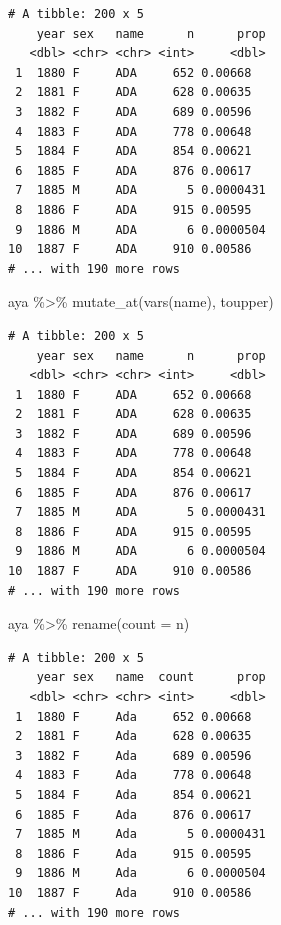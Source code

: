 \documentclass[
]{book}
\newenvironment{Shaded}{\begin{snugshade}}{\end{snugshade}}
\newcommand{\AttributeTok}[1]{\textcolor[rgb]{0.77,0.63,0.00}{#1}}
\newcommand{\FunctionTok}[1]{\textcolor[rgb]{0.00,0.00,0.00}{#1}}
\newcommand{\NormalTok}[1]{#1}
\newcommand{\SpecialCharTok}[1]{\textcolor[rgb]{0.00,0.00,0.00}{#1}}
\begin{document}
\begin{verbatim}
# A tibble: 200 x 5
    year sex   name      n      prop
   <dbl> <chr> <chr> <int>     <dbl>
 1  1880 F     ADA     652 0.00668  
 2  1881 F     ADA     628 0.00635  
 3  1882 F     ADA     689 0.00596  
 4  1883 F     ADA     778 0.00648  
 5  1884 F     ADA     854 0.00621  
 6  1885 F     ADA     876 0.00617  
 7  1885 M     ADA       5 0.0000431
 8  1886 F     ADA     915 0.00595  
 9  1886 M     ADA       6 0.0000504
10  1887 F     ADA     910 0.00586  
# ... with 190 more rows
\end{verbatim}

\begin{Shaded}
\begin{Highlighting}[]
\NormalTok{aya }\SpecialCharTok{\%\textgreater{}\%} \FunctionTok{mutate\_at}\NormalTok{(}\FunctionTok{vars}\NormalTok{(name), toupper)}
\end{Highlighting}
\end{Shaded}

\begin{verbatim}
# A tibble: 200 x 5
    year sex   name      n      prop
   <dbl> <chr> <chr> <int>     <dbl>
 1  1880 F     ADA     652 0.00668  
 2  1881 F     ADA     628 0.00635  
 3  1882 F     ADA     689 0.00596  
 4  1883 F     ADA     778 0.00648  
 5  1884 F     ADA     854 0.00621  
 6  1885 F     ADA     876 0.00617  
 7  1885 M     ADA       5 0.0000431
 8  1886 F     ADA     915 0.00595  
 9  1886 M     ADA       6 0.0000504
10  1887 F     ADA     910 0.00586  
# ... with 190 more rows
\end{verbatim}

\begin{Shaded}
\begin{Highlighting}[]
\NormalTok{aya }\SpecialCharTok{\%\textgreater{}\%} \FunctionTok{rename}\NormalTok{(}\AttributeTok{count =}\NormalTok{ n)}
\end{Highlighting}
\end{Shaded}

\begin{verbatim}
# A tibble: 200 x 5
    year sex   name  count      prop
   <dbl> <chr> <chr> <int>     <dbl>
 1  1880 F     Ada     652 0.00668  
 2  1881 F     Ada     628 0.00635  
 3  1882 F     Ada     689 0.00596  
 4  1883 F     Ada     778 0.00648  
 5  1884 F     Ada     854 0.00621  
 6  1885 F     Ada     876 0.00617  
 7  1885 M     Ada       5 0.0000431
 8  1886 F     Ada     915 0.00595  
 9  1886 M     Ada       6 0.0000504
10  1887 F     Ada     910 0.00586  
# ... with 190 more rows
\end{verbatim}
\end{document}
